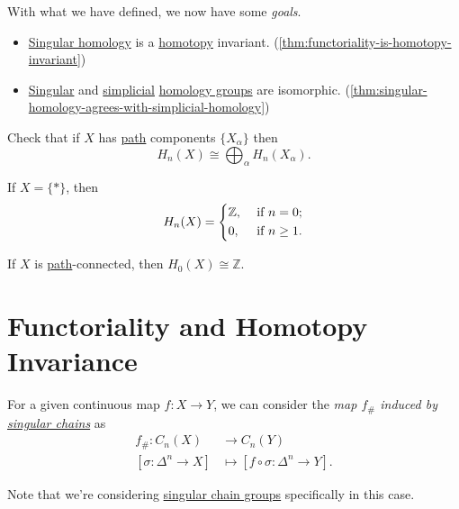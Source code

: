 With what we have defined, we now have some \emph{goals}.
\begin{itemize}
	\item \hyperref[def:singular-homology-group]{Singular homology} is a \hyperref[def:homotopy]{homotopy} invariant. (\autoref{thm:functoriality-is-homotopy-invariant})
	\item \hyperref[def:singular-homology-group]{Singular} and \hyperref[def:simplicial-homology-group]{simplicial} \hyperref[def:homology-group]{homology groups} are isomorphic. (\autoref{thm:singular-homology-agrees-with-simplicial-homology})
\end{itemize}

\begin{exercise}
	Check that if \(X\) has \hyperref[def:path]{path} components \(\{X_\alpha\}\) then
	\[
		H_n(X) \cong \bigoplus_\alpha H_n(X_\alpha).
	\]
\end{exercise}
\begin{exercise}
	If \(X = \{\ast\}\), then
	\[
		H_n(X) = \begin{dcases}
			\mathbb{Z}, & \text{ if } n=0 ;     \\
			0,          & \text{ if } n\geq 1 .
		\end{dcases}
	\]
\end{exercise}

\begin{exercise}
	If \(X\) is \hyperref[def:path]{path}-connected, then \(H_0(X) \cong \mathbb{Z}\).
\end{exercise}

\section{Functoriality and Homotopy Invariance}
\begin{definition}\label{def:induced-map-on-singular-chain}
	For a given continuous map \(f \colon X \to Y\), we can consider the \emph{map \(f_{\#}\) induced by \hyperref[def:singular-chain-group]{singular chains}} as
	\[
		\begin{split}
			f_{\#} \colon C_n(X)           & \to C_n(Y)                                      \\
			[\sigma \colon \Delta^n \to X] & \mapsto [f \circ \sigma \colon \Delta^n \to Y].
		\end{split}
	\]
\end{definition}
\begin{note}
	Note that we're considering \hyperref[def:singular-chain-group]{singular chain groups} specifically in this case.
\end{note}

